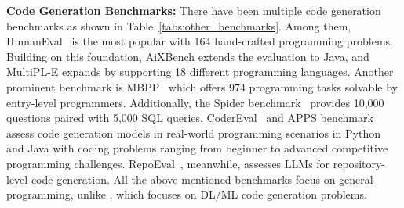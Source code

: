 \textbf{Code Generation Benchmarks: } There have been multiple code generation benchmarks as shown in Table~\ref{tabs:other_benchmarks}.
Among them, HumanEval~\cite{chen2021evaluating} is the most popular
with 164 hand-crafted programming problems.
Building on this foundation, AiXBench\cite{hao2022aixbench} extends the evaluation to Java, and MultiPL-E\cite{cassano2022multipl} expands
by supporting 18 different programming languages.
Another prominent benchmark is MBPP~\cite{austin2021program} which offers 974 programming tasks solvable by entry-level programmers.
Additionally, the Spider benchmark~\cite{yu2018spider} provides 10,000 questions paired with 5,000 SQL queries. 
CoderEval~\cite{yu2024codereval} and APPS benchmark~\cite{hendrycks2measuring} assess code generation models in real-world programming scenarios in Python and Java with coding problems ranging from beginner to advanced competitive programming challenges. RepoEval~\cite{zhang2023repocoder}, meanwhile, assesses LLMs for repository-level code generation. All the above-mentioned benchmarks focus on general programming, unlike \tool, which focuses on DL/ML code generation problems.


